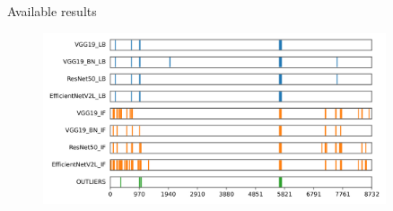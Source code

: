 \documentclass[aspectratio=169]{beamer}
\begin{document}
\begin{frame}{Available results}
    \begin{figure}
        \centering
        \includegraphics[width=0.9\textwidth]{./results/comparison/outlier_comparison.png}
    \end{figure}
\end{frame}
\end{document}
